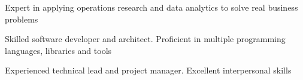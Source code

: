

\cventry
{} %
{} %
{} %
{} %
{
\begin{cvitems} %
    \item  {Expert in applying operations research and data analytics to solve real business problems} %
	\item  {Skilled software developer and architect. Proficient in multiple programming languages, libraries and tools} 
	\item  {Experienced technical lead and project manager. Excellent interpersonal skills} 
\end{cvitems}    
}


